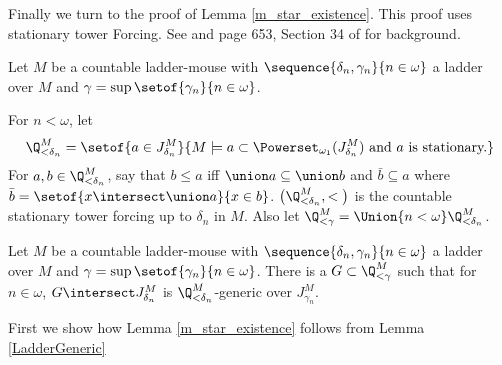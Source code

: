\documentclass[oneside,12pt]{amsart}
\begin{document}
Finally we turn to the proof of Lemma \ref{m_star_existence}. This proof uses
stationary tower Forcing. See \cite{Larson_Book} and page 653, Section 34 of \cite{Jech_Book2} for background.

Let $M$ be a countable ladder-mouse
with $\sequence{\delta_n,\gamma_n}{n\in\omega}$ a ladder over $M$ and
$\gamma=\sup\setof{\gamma_n}{n\in\omega}$.

For $n<\omega$, let
$$\Q_{<\delta_n}^M=\setof{a\in J^M_{\delta_n}}{M\models a\subset \Powerset_{\omega_1}(J^M_{\delta_n}) \text{ and } a \text{ is stationary.}}$$
For $a,b\in \Q_{<\delta_n}^M$, say that $b\leq a$ iff $\union a \subseteq \union b$ and $\bar{b} \subseteq a$ where $\bar{b}=\setof{x\intersect\union a}{x\in b}$.
$\big(\Q_{<\delta_n}^M, <\big)$ is the countable stationary tower forcing up to $\delta_n$ in $M$. Also let $\Q_{<\gamma}^M=\Union{n<\omega}\Q_{<\delta_n}^M$.

\begin{lemma}
\label{LadderGeneric}
Let $M$ be a countable ladder-mouse
with $\sequence{\delta_n,\gamma_n}{n\in\omega}$ a ladder over $M$ and
$\gamma=\sup\setof{\gamma_n}{n\in\omega}$.
There is a $G\subset \Q_{<\gamma}^M$ such that for $n\in\omega$, $G\intersect J^M_{\delta_n}$ is $\Q_{<\delta_n}^M$-generic over $J^M_{\gamma_n}$.
\end{lemma}

First we show how Lemma \ref{m_star_existence} follows from Lemma
\ref{LadderGeneric}
\end{document}
